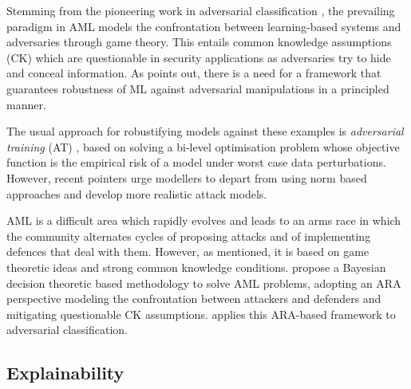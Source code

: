 Stemming from the pioneering work in adversarial classification 
\citep{adversarialClassification2004}, the prevailing paradigm in AML models
the confrontation between learning-based systems and adversaries through game theory. 
This entails common knowledge assumptions (CK) \citep{hargreaves2004game} which are 
questionable in security 
applications as adversaries try to hide and conceal information. 
As \cite{fan2019selective} points out, there is a need for a  framework that guarantees robustness of ML against adversarial manipulations in a principled manner. 

The usual approach for robustifying models against these examples is {\em adversarial training} (AT) \citep{madry2018towards}, based on solving a 
bi-level optimisation problem whose objective function is the empirical risk of a model under worst case data perturbations. %
However, recent pointers urge modellers to depart from using 
norm based approaches \citep{carlini2019evaluating} and develop more realistic attack models.


AML is a  difficult area which rapidly evolves and leads to an 
arms race in which the community alternates cycles of proposing attacks and  of implementing defences that deal with them. However, as mentioned, it is 
based on game theoretic ideas and strong common
knowledge conditions. 
\citep{AMLARA} propose a
Bayesian decision theoretic based methodology 
to solve AML problems, 
adopting an ARA perspective \citep{adversarialRiskAnalysis2009,banks2015adversarial} modeling the confrontation between attackers and defenders and mitigating questionable CK assumptions. \citep{math8111957} applies this ARA-based framework to  adversarial classification.

\subsection{Explainability}

